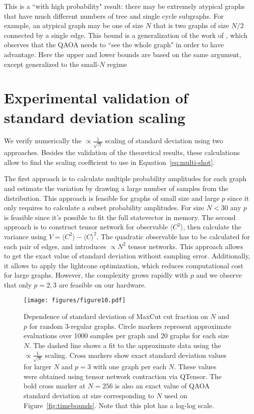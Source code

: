 \documentclass[prb,reprint,nofootinbib,longbibliography,superscriptaddress]{revtex4-1}
\begin{document}
This is a ``with high probability" result: there may be extremely atypical graphs that have much different numbers of tree and single cycle subgraphs. For example, an atypical graph may be one of size $N$ that is two graphs of size $N/2$ connected by a single edge. This bound is a generalization of the work of \cite{farhi2020quantum}, which observes that the QAOA needs to ``see the whole graph" in order to have advantage. Here the upper and lower bounds are based on the same argument, except generalized to the small-$N$ regime%


\section{Experimental validation of standard deviation scaling}
\label{sec:sd_experiment}

We verify numerically the $\propto \frac{1}{\sqrt N}$ scaling of standard deviation using two approaches.
Besides the validation of the theoretical results, these calculations allow to find the scaling coefficient to use in Equation~\ref{eq:multi-shot}.

The first approach is to calculate multiple probability amplitudes for each graph and estimate the variation by drawing a large number of samples from the distribution. This approach is feasible for graphs of small size and large $p$ since it only requires to calculate a subset probability amplitudes. For size $N<30$ any $p$ is feasible since it's possible to fit the full statevector in memory.
The second approach is to construct tensor network for observable $\langle C^2 \rangle$, then calculate the variance using $V = \langle C^2 \rangle - \langle C \rangle^2$. The quadratic observable has to be calculated for each pair of edges, and introduces $\propto N^2$ tensor networks. This approach allows to get the exact value of standard deviation without sampling error. Additionally, it allows to apply the lightcone optimization, which reduces computational cost for large graphs. However, the complexity grows rapidly with $p$ and we observe that only $p=2, 3$ are feasible on our hardware.

\begin{figure}
    \centering
    \texttt{[image: figures/figure10.pdf]}
    \caption{Dependence of standard deviation of MaxCut cut fraction on $N$ and $p$ for random 3-regular graphs. 
    Circle markers represent approximate evaluations over 1000 samples per graph and 20 graphs for each size $N$. The dashed line shows a fit to the approximate data using the $\propto \frac{1}{\sqrt N}$ scaling.
    Cross markers show exact standard deviation values for larger $N$ and $p=3$ with one graph per each $N$. These values were obtained using tensor network contraction via QTensor. 
    The bold cross marker at $N=256$ is also an exact value of QAOA standard deviation at size corresponding to $N$ used on Figure~\ref{fig:timebounds}.
    Note that this plot has a log-log scale.
    }
    \label{fig:sd_vs_n}
\end{figure}
\end{document}
